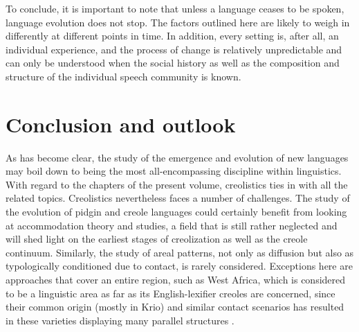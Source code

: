 \documentclass[output=paper,
modfonts
]{langscibook}
\begin{document}
To conclude, it is important to note that unless a language ceases to be spoken, language evolution does not stop. The factors outlined here are likely to weigh in differently at different points in time. In addition, every setting is, after all, an individual experience, and the process of change is relatively unpredictable and can only be understood when the social history as well as the composition and structure of the individual speech community is known.

\section{Conclusion and outlook} \label{conclusion}

As has become clear, the study of the emergence and evolution of new languages may boil down to being the most all-encompassing discipline within linguistics. With regard to the chapters of the present volume, creolistics ties in with all the related topics. Creolistics nevertheless faces a number of challenges. The study of the evolution of pidgin and creole languages could certainly benefit from looking at accommodation theory and studies, a field that is still rather neglected and will shed light on the earliest stages of creolization as well as the creole continuum. Similarly, the study of areal patterns, not only as diffusion but also as typologically conditioned due to contact, is rarely considered. Exceptions here are approaches that cover an entire region, such as West Africa, which is considered to be a linguistic area as far as its English-lexifier creoles are concerned, since their common origin (mostly in Krio) and similar contact scenarios has resulted in these varieties displaying many parallel structures \citep{peteretal2007comparison,yakpo2017towards}.
\end{document}
